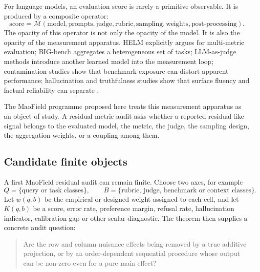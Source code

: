 \documentclass[11pt]{article}
\theoremstyle{remark}
\begin{document}
For language models, an evaluation score is rarely a primitive observable. It is produced by a composite operator:
\[
\text{score}=\mathcal{M}(\text{model},\text{prompts},\text{judge},\text{rubric},\text{sampling},\text{weights},\text{post-processing}).
\]
The opacity of this operator is not only the opacity of the model. It is also the opacity of the measurement apparatus. HELM explicitly argues for multi-metric evaluation; BIG-bench aggregates a heterogeneous set of tasks; LLM-as-judge methods introduce another learned model into the measurement loop; contamination studies show that benchmark exposure can distort apparent performance; hallucination and truthfulness studies show that surface fluency and factual reliability can separate \cite{helm2022,bigbench2022,mtbench2023,geval2023,truthfulqa2021,selfcheckgpt2023,contamination2024,rethinkingcontamination2023}.

The MaoField programme proposed here treats this measurement apparatus as an object of study. A residual-metric audit asks whether a reported residual-like signal belongs to the evaluated model, the metric, the judge, the sampling design, the aggregation weights, or a coupling among them.

\subsection{Candidate finite objects}

A first MaoField residual audit can remain finite. Choose two axes, for example
\[
Q=\{\text{query or task classes}\},\qquad
B=\{\text{rubric, judge, benchmark or context classes}\}.
\]
Let $w(q,b)$ be the empirical or designed weight assigned to each cell, and let $K(q,b)$ be a score, error rate, preference margin, refusal rate, hallucination indicator, calibration gap or other scalar diagnostic. The theorem then supplies a concrete audit question:
\begin{quote}
Are the row and column nuisance effects being removed by a true additive projection, or by an order-dependent sequential procedure whose output can be non-zero even for a pure main effect?
\end{quote}
\end{document}
